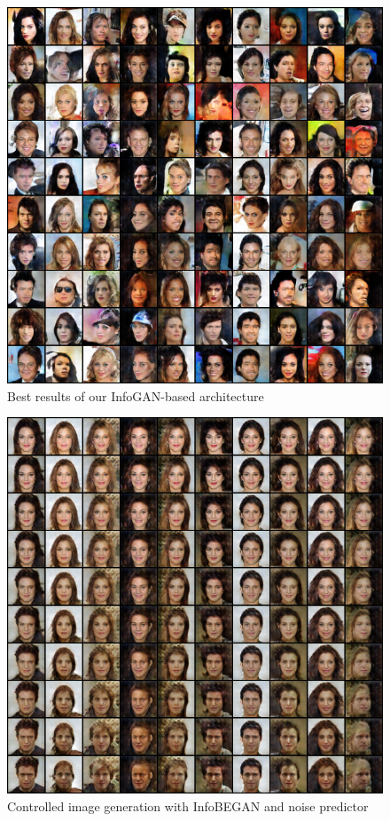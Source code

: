 \documentclass[10pt,journal,compsoc]{IEEEtran}
\begin{document}
\begin{figure}[h]
	\centering
	\includegraphics[width=1\linewidth]{pic/best1}
	\caption{Best results of our InfoGAN-based architecture}
	\label{fig:best1}
\end{figure}

\begin{figure}[h]
	\centering
	\includegraphics[width=1\linewidth]{pic/best2}
	\caption{Controlled image generation with InfoBEGAN and noise predictor}
	\label{fig:best2}
\end{figure}
\end{document}
